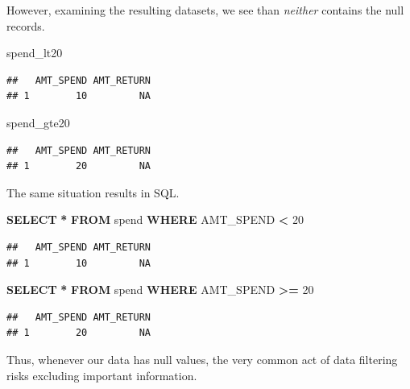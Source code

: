 \documentclass[
]{krantz}
\makeatletter
\newenvironment{Shaded}{\begin{snugshade}}{\end{snugshade}}
\newcommand{\DecValTok}[1]{\textcolor[rgb]{0.06,0.06,0.06}{#1}}
\newcommand{\KeywordTok}[1]{\textcolor[rgb]{0.27,0.27,0.27}{\textbf{#1}}}
\newcommand{\NormalTok}[1]{#1}
\newcommand{\OperatorTok}[1]{\textcolor[rgb]{0.43,0.43,0.43}{\textbf{#1}}}
\newenvironment{kframe}{%
\medskip{}
\setlength{\fboxsep}{.8em}
 \def\at@end@of@kframe{}%
 \ifinner\ifhmode%
  \def\at@end@of@kframe{\end{minipage}}%
  \begin{minipage}{\columnwidth}%
 \fi\fi%
 \def\FrameCommand##1{\hskip\@totalleftmargin \hskip-\fboxsep
 \colorbox{shadecolor}{##1}\hskip-\fboxsep
     \hskip-\linewidth \hskip-\@totalleftmargin \hskip\columnwidth}%
 \MakeFramed {\advance\hsize-\width
   \@totalleftmargin\z@ \linewidth\hsize
   \@setminipage}}%
 {\par\unskip\endMakeFramed%
 \at@end@of@kframe}
\renewenvironment{Shaded}{\begin{kframe}}{\end{kframe}}
\makeatother
\begin{document}
However, examining the resulting datasets, we see than \emph{neither} contains the null records.

\begin{Shaded}
\begin{Highlighting}[]
\NormalTok{spend\_lt20}
\end{Highlighting}
\end{Shaded}

\begin{verbatim}
##   AMT_SPEND AMT_RETURN
## 1        10         NA
\end{verbatim}

\begin{Shaded}
\begin{Highlighting}[]
\NormalTok{spend\_gte20}
\end{Highlighting}
\end{Shaded}

\begin{verbatim}
##   AMT_SPEND AMT_RETURN
## 1        20         NA
\end{verbatim}

The same situation results in SQL.

\begin{Shaded}
\begin{Highlighting}[]
\KeywordTok{SELECT} \OperatorTok{*}
\KeywordTok{FROM}\NormalTok{ spend}
\KeywordTok{WHERE}\NormalTok{ AMT\_SPEND }\OperatorTok{\textless{}} \DecValTok{20}
\end{Highlighting}
\end{Shaded}

\begin{verbatim}
##   AMT_SPEND AMT_RETURN
## 1        10         NA
\end{verbatim}

\begin{Shaded}
\begin{Highlighting}[]
\KeywordTok{SELECT} \OperatorTok{*}
\KeywordTok{FROM}\NormalTok{ spend}
\KeywordTok{WHERE}\NormalTok{ AMT\_SPEND }\OperatorTok{\textgreater{}=} \DecValTok{20}
\end{Highlighting}
\end{Shaded}

\begin{verbatim}
##   AMT_SPEND AMT_RETURN
## 1        20         NA
\end{verbatim}

Thus, whenever our data has null values, the very common act of data filtering risks excluding important information.
\end{document}
